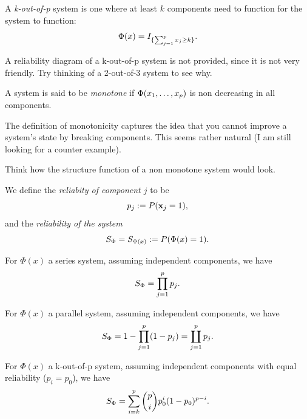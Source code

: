 \begin{definition}
A \emph{k-out-of-p} system is one where at least $k$ components need to function for the system to function:
$$\Phi(x)=I_{\{ \sum_{j=1}^{p} x_j \geq k \}}.$$
\end{definition}



\begin{think}
	A reliability diagram of a k-out-of-p system is not provided, since it is not very friendly. Try thinking of a 2-out-of-3 system to see why.
\end{think}



\begin{definition}
A system is said to be \emph{monotone} if $\Phi(x_1,\dots,x_p)$ is non decreasing in all components.
\end{definition}
The definition of monotonicity captures the idea that you cannot improve a system's state by breaking components.
This seems rather natural (I am still looking for a counter example).


\begin{think}
	Think how the structure function of a non monotone system would look.
\end{think}




\begin{definition}[Reliability]
We define the \emph{reliabity of component $j$} to be $$p_j:= P(\mathbf{x}_j=1),$$ 
and  the \emph{reliability of the system} 
$$ S_\Phi = S_{\Phi(x)}:=P(\Phi(x)=1).$$
\end{definition}


\begin{example}
For $\Phi(x)$ a series system, assuming independent components, we have
$$ S_\Phi= \prod_{j=1}^{p} p_j.$$
\end{example}


\begin{example}
For $\Phi(x)$ a parallel system, assuming independent components, we have
$$ S_\Phi= 1-\prod_{j=1}^{p} (1-p_j)= \coprod_{j=1}^p p_j. $$
\end{example}


\begin{example}
For $\Phi(x)$ a k-out-of-p system, assuming independent components with equal reliability ($p_i=p_0$), we have
$$ S_\Phi= \sum_{i=k}^{p} \binom{p}{i} p_0^i (1-p_0)^{p-i} .$$
\end{example}



